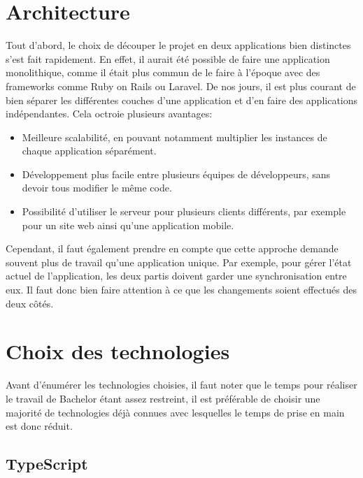 \section{Architecture}


Tout d'abord, le choix de découper le projet en deux applications bien distinctes s'est fait rapidement. En effet, il aurait été possible de faire une application monolithique, comme il était plus commun de le faire à l'époque avec des frameworks comme Ruby on Rails ou Laravel. De nos jours, il est plus courant de bien séparer les différentes couches d'une application et d'en faire des applications indépendantes. Cela octroie plusieurs avantages:

\begin{itemize}
  \item Meilleure scalabilité, en pouvant notamment multiplier les instances de chaque application séparément.
  \item Développement plus facile entre plusieurs équipes de développeurs, sans devoir tous modifier le même code.
  \item Possibilité d'utiliser le serveur pour plusieurs clients différents, par exemple pour un site web ainsi qu'une application mobile.
\end{itemize}

Cependant, il faut également prendre en compte que cette approche demande souvent plus de travail qu'une application unique. Par exemple, pour gérer l'état actuel de l'application, les deux partis doivent garder une synchronisation entre eux. Il faut donc bien faire attention à ce que les changements soient effectués des deux côtés.


\section{Choix des technologies}

Avant d'énumérer les technologies choisies, il faut noter que le temps pour réaliser le travail de Bachelor étant assez restreint, il est préférable de choisir une majorité de technologies déjà connues avec lesquelles le temps de prise en main est donc réduit.

\subsection{TypeScript}

